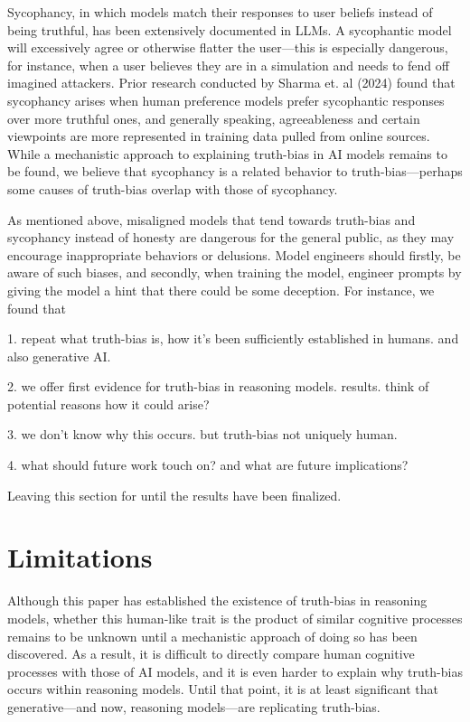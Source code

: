 \documentclass{article}
\begin{document}
Sycophancy, in which models match their responses to user beliefs instead of being truthful, has been extensively documented in LLMs. A sycophantic model will excessively agree or otherwise flatter the user---this is especially dangerous, for instance, when a user believes they are in a simulation and needs to fend off imagined attackers. Prior research conducted by Sharma et. al (2024) found that sycophancy arises when human preference models prefer sycophantic responses over more truthful ones, and generally speaking, agreeableness and certain viewpoints are more represented in training data pulled from online sources. While a mechanistic approach to explaining truth-bias in AI models remains to be found, we believe that sycophancy is a related behavior to truth-bias---perhaps some causes of truth-bias overlap with those of sycophancy.

As mentioned above, misaligned models that tend towards truth-bias and sycophancy instead of honesty are dangerous for the general public, as they may encourage inappropriate behaviors or delusions. Model engineers should firstly, be aware of such biases, and secondly, when training the model, engineer prompts by giving the model a hint that there could be some deception. For instance, we found that 

1. repeat what truth-bias is, how it's been sufficiently established in humans. and also generative AI.

2. we offer first evidence for truth-bias in reasoning models. results. think of potential reasons how it could arise?

3. we don't know why this occurs. but truth-bias not uniquely human.

4. what should future work touch on? and what are future implications?

Leaving this section for until the results have been finalized.

\section{Limitations}

Although this paper has established the existence of truth-bias in reasoning models, whether this human-like trait is the product of similar cognitive processes remains to be unknown until a mechanistic approach of doing so has been discovered. As a result, it is difficult to directly compare human cognitive processes with those of AI models, and it is even harder to explain why truth-bias occurs within reasoning models. Until that point, it is at least significant that generative---and now, reasoning models---are replicating truth-bias.
\end{document}
